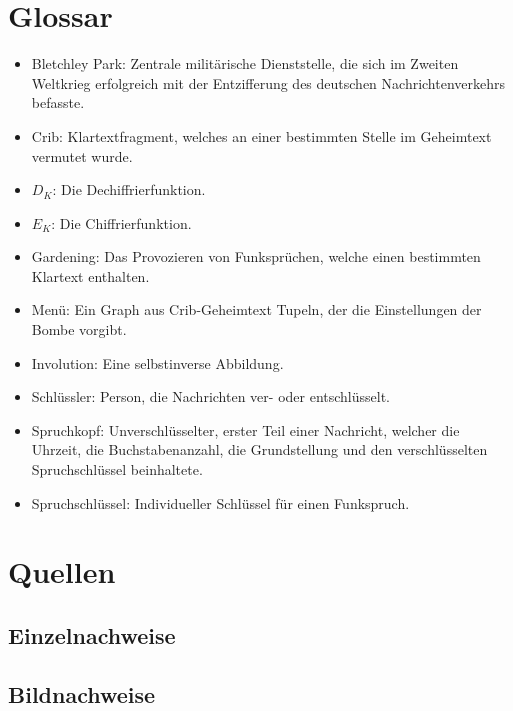 \documentclass[ngerman, a4paper, footsepline, headsepline]{scrreport}
\begin{document}
	\chapter{Glossar}\label{sec:glossar}
	\begin{itemize}
		\item Bletchley Park: Zentrale militärische Dienststelle, die sich im Zweiten Weltkrieg erfolgreich mit der Entzifferung des deutschen Nachrichtenverkehrs befasste.
		\item Crib: Klartextfragment, welches an einer bestimmten Stelle im Geheimtext vermutet wurde.
		\item $D_K$: Die Dechiffrierfunktion.
		\item $E_K$: Die Chiffrierfunktion.
		\item Gardening: Das Provozieren von Funksprüchen, welche einen bestimmten Klartext enthalten.
		\item Menü: Ein Graph aus Crib-Geheimtext Tupeln, der die Einstellungen der Bombe vorgibt.
		\item Involution: Eine selbstinverse Abbildung.
		\item Schlüssler: Person, die Nachrichten ver- oder entschlüsselt.
		\item Spruchkopf: Unverschlüsselter, erster Teil einer Nachricht, welcher die Uhrzeit, die Buchstabenanzahl, die Grundstellung und den verschlüsselten Spruchschlüssel beinhaltete.
		\item Spruchschlüssel:  Individueller Schlüssel für einen Funkspruch.
	\end{itemize}
	
	\chapter{Quellen}\label{ch:sources}
	\section{Einzelnachweise}\label{sec:einzelnachweise}
	\printbibliography[keyword=sources, heading=none, title={}]
	\section{Bildnachweise}\label{sec:bildnachweise}
	\printbibliography[keyword=pictures, heading=none, title={}]
	\nocite{*}
	\thispagestyle{plain}
	
	
	\appendix
	
\end{document}
